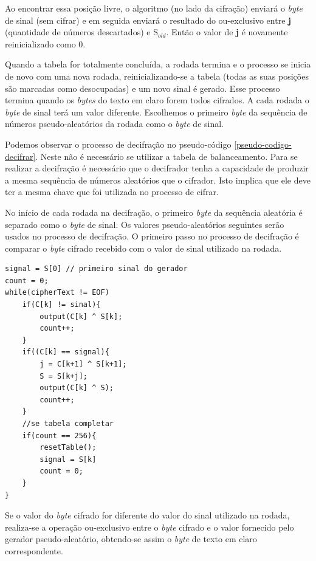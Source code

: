 Ao encontrar essa posição livre, o algoritmo (no lado da cifração) enviará o \textit{byte} de sinal (sem cifrar) e em seguida enviará o resultado do ou-exclusivo entre \textbf{j} (quantidade de números descartados) e S$_{old}$. Então o valor de \textbf{j} é novamente reinicializado como 0.

Quando a tabela for totalmente concluída, a rodada termina e o processo se inicia de novo com uma nova rodada, reinicializando-se a tabela (todas as suas posições são marcadas como desocupadas) e um novo sinal é gerado. Esse processo termina quando os \textit{bytes} do texto em claro forem todos cifrados. A cada rodada o \textit{byte} de sinal terá um valor diferente. Escolhemos o primeiro \textit{byte} da sequência de números pseudo-aleatórios da rodada como o \textit{byte} de sinal.

Podemos observar o processo de decifração no pseudo-código \ref{pseudo-codigo-decifrar}. Neste não é necessário se utilizar a tabela de balanceamento. Para se realizar a decifração é necessário que o decifrador tenha a capacidade de produzir a mesma sequência de números aleatórios que o cifrador. Isto implica que ele deve ter a mesma chave que foi utilizada no processo de cifrar.

No início de cada rodada na decifração, o primeiro \textit{byte} da sequência aleatória é separado como o \textit{byte} de sinal. Os valores pseudo-aleatórios seguintes serão usados no processo de decifração. O primeiro passo no processo de decifração é comparar o \textit{byte} cifrado recebido com o valor de sinal utilizado na rodada. 



    \begin{lstlisting}[caption={Pseudo-Código Decifração}, label=pseudo-codigo-decifrar]
signal = S[0] // primeiro sinal do gerador
count = 0;
while(cipherText != EOF)
	if(C[k] != sinal){
		output(C[k] ^ S[k];
		count++;
	}
	if((C[k] == signal){
		j = C[k+1] ^ S[k+1];
		S = S[k+j];
		output(C[k] ^ S);
		count++;
	}
	//se tabela completar
	if(count == 256){
		resetTable();
		signal = S[k]
		count = 0;
	}
}
    \end{lstlisting}

Se o valor do \textit{byte} cifrado for diferente do valor do sinal utilizado na rodada, realiza-se a operação ou-exclusivo entre o \textit{byte} cifrado e o valor fornecido pelo gerador pseudo-aleatório, obtendo-se assim o \textit{byte} de texto em claro correspondente.

